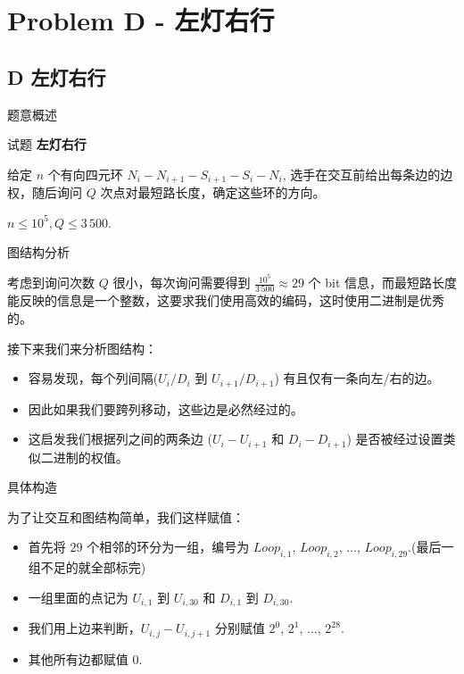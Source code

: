 \documentclass{beamer}
\newcommand{\TT}[1] {{\ttfamily #1}}
\newcommand{\BF}[1] {\textbf{#1}}
\begin{document}
{

\section[D]{Problem D - 左灯右行}
\subsection{D 左灯右行}




\begin{frame}{题意概述}

\begin{center}
试题 \myboxiv{      \BF{\TT{D}}} \BF{左灯右行}
\end{center}

给定 $n$ 个有向四元环 $N_i - N_{i + 1} - S_{i + 1} - S_i - N_i$, 选手在交互前给出每条边的边权，随后询问 $Q$ 次点对最短路长度，确定这些环的方向。

$n \le 10^5, Q \le 3\,500$.

\end{frame}


\begin{frame}{图结构分析}

考虑到询问次数 $Q$ 很小，每次询问需要得到 $\frac{10^5}{3\,500} \approx 29$ 个 bit 信息，而最短路长度能反映的信息是一个整数，这要求我们使用高效的编码，这时使用二进制是优秀的。

接下来我们来分析图结构：

\begin{itemize}
  \item 容易发现，每个列间隔($U_i/D_i$ 到 $U_{i + 1}/D_{i + 1}$) 有且仅有一条向左/右的边。
  \item 因此如果我们要跨列移动，这些边是必然经过的。
  \item 这启发我们根据列之间的两条边 ($U_i - U_{i + 1}$ 和 $D_i - D_{i + 1}$) 是否被经过设置类似二进制的权值。
\end{itemize}

\end{frame}

\begin{frame}{具体构造}

为了让交互和图结构简单，我们这样赋值：

\begin{itemize}
  \item 首先将 $29$ 个相邻的环分为一组，编号为 $Loop_{i, 1}$, $Loop_{i, 2}$, $\ldots$, $Loop_{i, 29}$.(最后一组不足的就全部标完)
  \item 一组里面的点记为 $U_{i, 1}$ 到 $U_{i, 30}$ 和 $D_{i, 1}$ 到 $D_{i, 30}$.
  \item 我们用上边来判断，$U_{i, j} - U_{i, j + 1}$ 分别赋值 $2^0$, $2^1$, $\ldots$, $2^{28}$.
  \item 其他所有边都赋值 $0$. 
\end{itemize}


\end{frame}}
\end{document}
